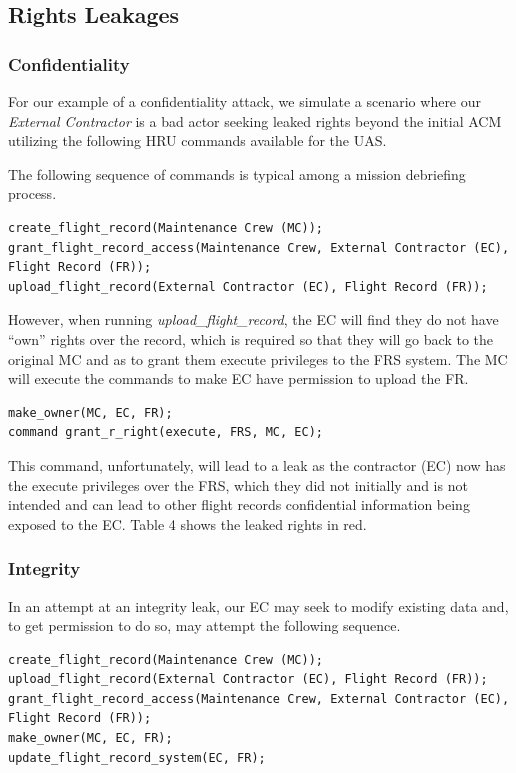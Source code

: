 \documentclass[10pt,journal,compsoc]{IEEEtran}
\begin{document}
\subsection{Rights Leakages}
  
\subsubsection{Confidentiality}

  For our example of a confidentiality attack, we simulate a scenario where our \textit{External Contractor} is a bad actor seeking leaked rights beyond the initial ACM utilizing the following HRU commands available for the UAS.

  The following sequence of commands is typical among a mission debriefing process. 

\begin{lstlisting}
create_flight_record(Maintenance Crew (MC));
grant_flight_record_access(Maintenance Crew, External Contractor (EC), Flight Record (FR));
upload_flight_record(External Contractor (EC), Flight Record (FR));
\end{lstlisting}  

  However, when running \textit{upload\_flight\_record}, the EC will find they do not have ``own'' rights over the record, which is required so that they will go back to the original MC and as to grant them execute privileges to the FRS system. 
  The MC will execute the commands to make EC have permission to upload the FR. 

\begin{lstlisting}
make_owner(MC, EC, FR);
command grant_r_right(execute, FRS, MC, EC);
\end{lstlisting}

  This command, unfortunately, will lead to a leak as the contractor (EC) now has the execute privileges over the FRS, which they did not initially and is not intended and can lead to other flight records confidential information being exposed to the EC. 
  Table 4 shows the leaked rights in red. 

\subsubsection{Integrity}

  In an attempt at an integrity leak, our EC may seek to modify existing data and, to get permission to do so, may attempt the following sequence. 

\begin{lstlisting}
create_flight_record(Maintenance Crew (MC));
upload_flight_record(External Contractor (EC), Flight Record (FR));
grant_flight_record_access(Maintenance Crew, External Contractor (EC), Flight Record (FR));
make_owner(MC, EC, FR);
update_flight_record_system(EC, FR);
\end{lstlisting}  
\end{document}
